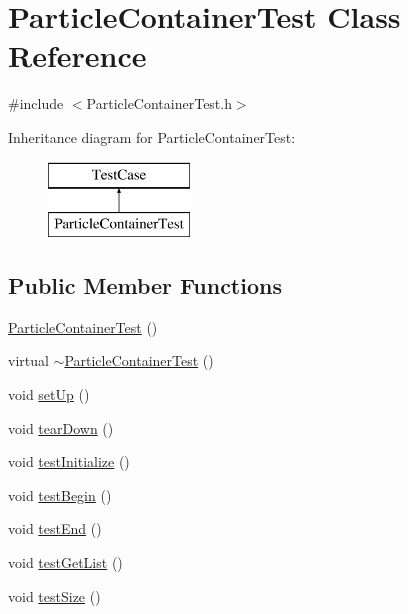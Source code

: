 \hypertarget{classParticleContainerTest}{\section{Particle\-Container\-Test Class Reference}
\label{classParticleContainerTest}
}


{\ttfamily \#include $<$Particle\-Container\-Test.\-h$>$}

Inheritance diagram for Particle\-Container\-Test\-:\begin{figure}[H]
\begin{center}
\leavevmode
\includegraphics[height=2.000000cm]{classParticleContainerTest}
\end{center}
\end{figure}
\subsection*{Public Member Functions}
\begin{DoxyCompactItemize}
\item 
\hyperlink{classParticleContainerTest_ac9c892489b33cc0fb091eca01677f74e}{Particle\-Container\-Test} ()
\item 
virtual \hyperlink{classParticleContainerTest_a6fff30944bc8d19c2a838ac0735222fc}{$\sim$\-Particle\-Container\-Test} ()
\item 
void \hyperlink{classParticleContainerTest_a114674bf106f1237eb8e5d0afa2cead0}{set\-Up} ()
\item 
void \hyperlink{classParticleContainerTest_a3109d4eb4afad3ff4c046fc47ad4fcc4}{tear\-Down} ()
\item 
void \hyperlink{classParticleContainerTest_a4cdf950edb489d8097227db9266e7d50}{test\-Initialize} ()
\item 
void \hyperlink{classParticleContainerTest_ae720809123b33fd904ac94aa316c0614}{test\-Begin} ()
\item 
void \hyperlink{classParticleContainerTest_a2703e03485bff5309ff791701fc1c890}{test\-End} ()
\item 
void \hyperlink{classParticleContainerTest_a05b72ca03cb3f7aa141848af6710205a}{test\-Get\-List} ()
\item 
void \hyperlink{classParticleContainerTest_a51079ca20b39f6379629c6d34db08014}{test\-Size} ()
\end{DoxyCompactItemize}
